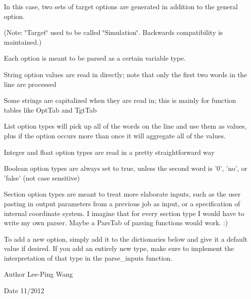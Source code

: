 \-In this case, two sets of target options are generated in addition to the general option.

(\-Note\-: \char`\"{}\-Target\char`\"{} used to be called \char`\"{}\-Simulation\char`\"{}. \-Backwards compatibility is maintained.)

\-Each option is meant to be parsed as a certain variable type.


\begin{DoxyItemize}
\item \-String option values are read in directly; note that only the first two words in the line are processed
\item \-Some strings are capitalized when they are read in; this is mainly for function tables like \-Opt\-Tab and \-Tgt\-Tab
\item \-List option types will pick up all of the words on the line and use them as values, plus if the option occurs more than once it will aggregate all of the values.
\item \-Integer and float option types are read in a pretty straightforward way
\item \-Boolean option types are always set to true, unless the second word is '0', 'no', or 'false' (not case sensitive)
\item \-Section option types are meant to treat more elaborate inputs, such as the user pasting in output parameters from a previous job as input, or a specification of internal coordinate system. \-I imagine that for every section type \-I would have to write my own parser. \-Maybe a \-Pars\-Tab of parsing functions would work. \-:)
\end{DoxyItemize}

\-To add a new option, simply add it to the dictionaries below and give it a default value if desired. \-If you add an entirely new type, make sure to implement the interpretation of that type in the parse\-\_\-inputs function.

\begin{DoxyAuthor}{\-Author}
\-Lee-\/\-Ping \-Wang 
\end{DoxyAuthor}
\begin{DoxyDate}{\-Date}
11/2012 
\end{DoxyDate}


